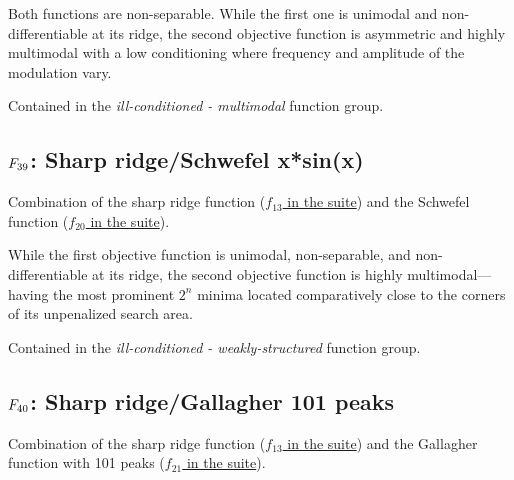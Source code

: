 Both functions are non-separable. While the first one
is unimodal and non-differentiable at its ridge, the second objective
function is asymmetric and highly multimodal with a low conditioning where
frequency and amplitude of the modulation vary.

Contained in the \emph{ill-conditioned - multimodal} function group.



\subsection[\texorpdfstring{\protect\(F_{39}\protect\): Sharp ridge/Schwefel x*sin(x)}{F39: Sharp ridge/Schwefel x*sin(x)}]{\texorpdfstring{\protect\(F_{39}\protect\): Sharp ridge/Schwefel x*sin(x)}{}}
\label{index:f39}\label{index:sharp-ridge-schwefel-x-sin-x}
Combination of the sharp ridge function (\href{https://coco.gforge.inria.fr/downloads/download16.00/bbobdocfunctions.pdf\#page=65}{\(f_{13}\) in the \bbob suite}) and the
Schwefel function (\href{https://coco.gforge.inria.fr/downloads/download16.00/bbobdocfunctions.pdf\#page=100}{\(f_{20}\) in the \bbob suite}).

While the first objective function is unimodal, non-separable, and
non-differentiable at its ridge, the second objective function is highly
multimodal---having the most prominent \(2^n\) minima located
comparatively close to the corners of its unpenalized search area.

Contained in the \emph{ill-conditioned - weakly-structured} function group.



\subsection[\texorpdfstring{\protect\(F_{40}\protect\): Sharp ridge/Gallagher 101 peaks}{F40: Sharp ridge/Gallagher 101 peaks}]{\texorpdfstring{\protect\(F_{40}\protect\): Sharp ridge/Gallagher 101 peaks}{}}
\label{index:f40}\label{index:sharp-ridge-gallagher-101-peaks}
Combination of the sharp ridge function (\href{https://coco.gforge.inria.fr/downloads/download16.00/bbobdocfunctions.pdf\#page=65}{\(f_{13}\) in the \bbob suite}) and the
Gallagher function with 101 peaks (\href{https://coco.gforge.inria.fr/downloads/download16.00/bbobdocfunctions.pdf\#page=105}{\(f_{21}\) in the \bbob suite}).

